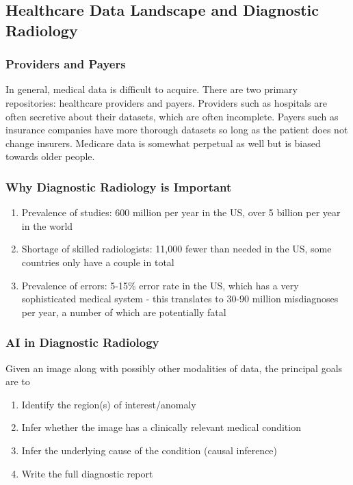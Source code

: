 \documentclass{article}
\begin{document}
\subsection{Healthcare Data Landscape and Diagnostic Radiology}
\subsubsection{Providers and Payers}
In general, medical data is difficult to acquire. There are two primary repositories: healthcare providers and payers. Providers such as hospitals are often secretive about their datasets, which are often incomplete. Payers such as insurance companies have more thorough datasets so long as the patient does not change insurers. Medicare data is somewhat perpetual as well but is biased towards older people.

\subsubsection{Why Diagnostic Radiology is Important}
\begin{enumerate}
    \item Prevalence of studies: 600 million per year in the US, over 5 billion per year in the world
    \item Shortage of skilled radiologists: 11,000 fewer than needed in the US, some countries only have a couple in total
    \item Prevalence of errors: 5-15\% error rate in the US, which has a very sophisticated medical system - this translates to 30-90 million misdiagnoses per year, a number of which are potentially fatal
\end{enumerate}

\subsubsection{AI in Diagnostic Radiology}
Given an image along with possibly other modalities of data, the principal goals are to
\begin{enumerate}
    \item Identify the region(s) of interest/anomaly
    \item Infer whether the image has a clinically relevant medical condition
    \item Infer the underlying cause of the condition (causal inference)
    \item Write the full diagnostic report
\end{enumerate}
\end{document}
